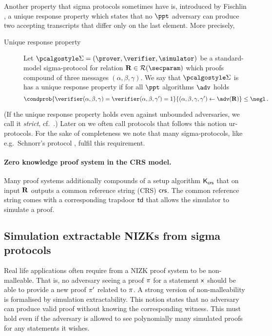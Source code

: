 \let\accentvec\vec \documentclass[runningheads,10pt]{llncs}
\begin{document}
Another property that sigma protocols sometimes have is, introduced by Fischlin \cite{C:Fischlin05}, a unique response property which states that no $\ppt$ adversary  can produce two accepting transcripts that differ only on the last element.
More precisely,
\begin{description}
	\item[Unique response property] Let $\sigmaprot = (\prover, \verifier,
			\simulator)$ be a standard-model sigma-protocol for relation $\REL \in \RELGEN(\secparam)$ which proofs compound of three messages $(\alpha, \beta, \gamma)$. We say that $\sigmaprot$ is has a unique response property if for all $\ppt$ algorithms $\adv$ holds
	\[
	\condprob{\verifier (\alpha, \beta, \gamma) = \verifier (\alpha, \beta, \gamma')  = 1}{(\alpha, \beta, \gamma, \gamma') \gets \adv(\REL)} \leq \negl\,.
	\]
\end{description}
(If the unique response property holds even against unbounded adversaries, we call it \emph{strict}, cf.~\cite{INDOCRYPT:FKMV12}.)
Later on we often call protocols that follows this notion ur-protocols.
For the sake of completeness we note that many sigma-protocols, like e.g.~Schnorr's protocol \cite{C:Schnorr89}, fulfil this requirement.

\paragraph{Zero knowledge proof system in the CRS model.}
Many proof systems additionally compounds of a setup algorithm $\mathsf{K}_{\mathsf{crs}}$ that on input $\mathbf{R}$ outputs a common reference string (CRS) $\mathsf{crs}$. The common reference string comes with a corresponding trapdoor $\mathsf{td}$ that allows the simulator to simulate a proof.

\subsection{Simulation extractable NIZKs from sigma protocols}
Real life applications often require from a NIZK proof system to be non-malleable. That is, no adversary seeing a proof $\pi$ for a statement $\mathsf{x}$ should be able to provide a new proof $\pi'$ related to $\pi$.
A strong version of non-malleability is formalised by simulation extractability.
This notion states that no adversary can produce valid proof without knowing
the corresponding witness. This must hold even if the adversary is allowed to see polynomially many simulated proofs for any statements it wishes.
\end{document}
